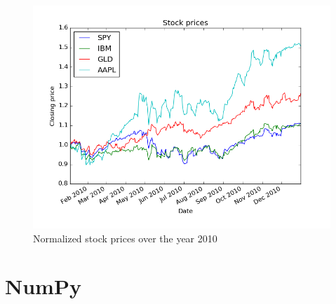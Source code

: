 \begin{figure}[h]
  \centering
  \includegraphics[width=\textwidth]{images/adj_close_normalized.png}
  \caption{Normalized stock prices over the year 2010}
\end{figure}
\newpage

\section{NumPy}

